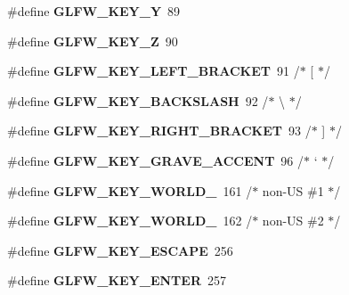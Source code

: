 \begin{DoxyCompactItemize}
\mbox{\label{group__keys_gafd9f115a549effdf8e372a787c360313}} 
\#define {\bfseries G\+L\+F\+W\+\_\+\+K\+E\+Y\+\_\+Y}~89
\item 
\mbox{\label{group__keys_gac489e208c26afda8d4938ed88718760a}} 
\#define {\bfseries G\+L\+F\+W\+\_\+\+K\+E\+Y\+\_\+Z}~90
\item 
\mbox{\label{group__keys_gad1c8d9adac53925276ecb1d592511d8a}} 
\#define {\bfseries G\+L\+F\+W\+\_\+\+K\+E\+Y\+\_\+\+L\+E\+F\+T\+\_\+\+B\+R\+A\+C\+K\+ET}~91  /$\ast$ \mbox{[} $\ast$/
\item 
\mbox{\label{group__keys_gab8155ea99d1ab27ff56f24f8dc73f8d1}} 
\#define {\bfseries G\+L\+F\+W\+\_\+\+K\+E\+Y\+\_\+\+B\+A\+C\+K\+S\+L\+A\+SH}~92  /$\ast$ \textbackslash{} $\ast$/
\item 
\mbox{\label{group__keys_ga86ef225fd6a66404caae71044cdd58d8}} 
\#define {\bfseries G\+L\+F\+W\+\_\+\+K\+E\+Y\+\_\+\+R\+I\+G\+H\+T\+\_\+\+B\+R\+A\+C\+K\+ET}~93  /$\ast$ \mbox{]} $\ast$/
\item 
\mbox{\label{group__keys_ga7a3701fb4e2a0b136ff4b568c3c8d668}} 
\#define {\bfseries G\+L\+F\+W\+\_\+\+K\+E\+Y\+\_\+\+G\+R\+A\+V\+E\+\_\+\+A\+C\+C\+E\+NT}~96  /$\ast$ ` $\ast$/
\item 
\mbox{\label{group__keys_gadc78dad3dab76bcd4b5c20114052577a}} 
\#define {\bfseries G\+L\+F\+W\+\_\+\+K\+E\+Y\+\_\+\+W\+O\+R\+L\+D\+\_}~161 /$\ast$ non-\/US \#1 $\ast$/
\item 
\mbox{\label{group__keys_ga20494bfebf0bb4fc9503afca18ab2c5e}} 
\#define {\bfseries G\+L\+F\+W\+\_\+\+K\+E\+Y\+\_\+\+W\+O\+R\+L\+D\+\_}~162 /$\ast$ non-\/US \#2 $\ast$/
\item 
\mbox{\label{group__keys_gaac6596c350b635c245113b81c2123b93}} 
\#define {\bfseries G\+L\+F\+W\+\_\+\+K\+E\+Y\+\_\+\+E\+S\+C\+A\+PE}~256
\item 
\mbox{\label{group__keys_ga9555a92ecbecdbc1f3435219c571d667}} 
\#define {\bfseries G\+L\+F\+W\+\_\+\+K\+E\+Y\+\_\+\+E\+N\+T\+ER}~257
\item 

\end{DoxyCompactItemize}
